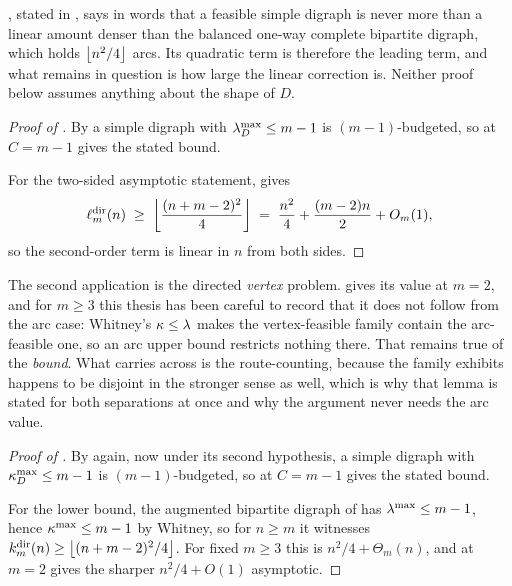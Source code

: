 , stated in , says in words that a feasible simple digraph is never more than a linear amount denser than the balanced one-way complete bipartite digraph, which holds $\left\lfloor n^2/4 \right\rfloor$ arcs. Its quadratic term is therefore the leading term, and what remains in question is how large the linear correction is. Neither proof below assumes anything about the shape of $D$.

\begin{proof}[Proof of ]
By  a simple digraph with $\lambda^{\max}_D \le m-1$ is $(m-1)$-budgeted, so  at $C = m-1$ gives the stated bound.

For the two-sided asymptotic statement,  gives
\[
    \ell_m^{\mathrm{dir}}(n) \;\ge\; \left\lfloor \frac{(n+m-2)^2}{4} \right\rfloor
    \;=\; \frac{n^2}{4} + \frac{(m-2)n}{2} + O_m(1),
\]
so the second-order term is linear in $n$ from both sides.
\end{proof}

The second application is the directed \emph{vertex} problem.  gives its value at $m=2$, and for $m \ge 3$ this thesis has been careful to record that it does not follow from the arc case: Whitney's $\kappa \le \lambda$ makes the vertex-feasible family contain the arc-feasible one, so an arc upper bound restricts nothing there. That remains true of the \emph{bound}. What carries across is the route-counting, because the family  exhibits happens to be disjoint in the stronger sense as well, which is why that lemma is stated for both separations at once and why the argument never needs the arc value.

\begin{proof}[Proof of ]
By  again, now under its second hypothesis, a simple digraph with $\kappa^{\max}_D \le m-1$ is $(m-1)$-budgeted, so  at $C = m-1$ gives the stated bound.

For the lower bound, the augmented bipartite digraph of  has $\lambda^{\max} \le m-1$, hence $\kappa^{\max} \le m-1$ by Whitney, so for $n \ge m$ it witnesses $k_m^{\mathrm{dir}}(n) \ge \left\lfloor (n+m-2)^2/4 \right\rfloor$. For fixed $m\ge3$ this is $n^2/4 + \Theta_m(n)$, and at $m=2$  gives the sharper $n^2/4+O(1)$ asymptotic.
\end{proof}

